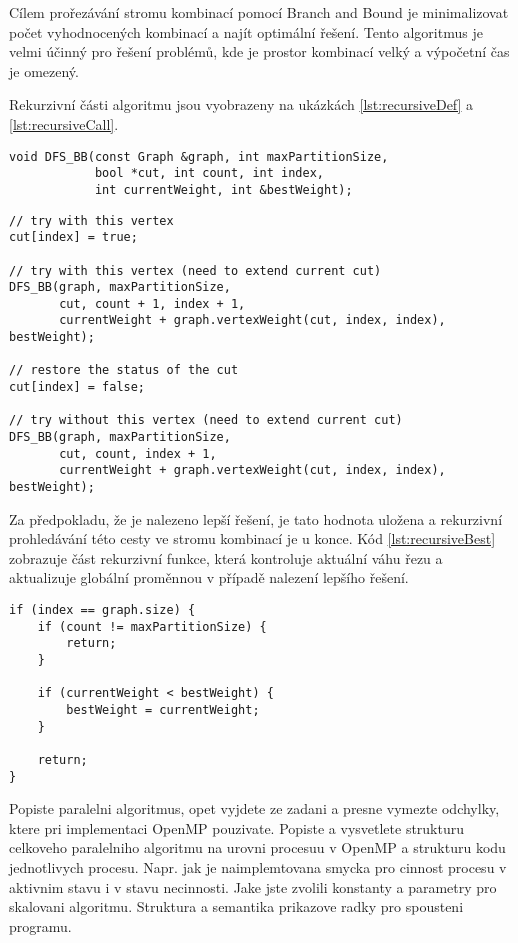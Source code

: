 \documentclass[epsf,epic,eepic,eepicemu]{article}\oddsidemargin=-5mm
\begin{document}
Cílem prořezávání stromu kombinací pomocí Branch and Bound je minimalizovat počet vyhodnocených kombinací a najít optimální řešení. Tento algoritmus je velmi účinný pro řešení problémů, kde je prostor kombinací velký a výpočetní čas je omezený. \cite{coursesPDPBFS}

Rekurzivní části algoritmu jsou vyobrazeny na ukázkách \ref{lst:recursiveDef} a \ref{lst:recursiveCall}.

\begin{lstlisting}[float,label=lst:recursiveDef, caption={Prototyp rekurzivní funkce}]
void DFS_BB(const Graph &graph, int maxPartitionSize,
            bool *cut, int count, int index,
            int currentWeight, int &bestWeight);
\end{lstlisting}

\begin{lstlisting}[float,label=lst:recursiveCall, caption={Rekurzivní volání}]
// try with this vertex
cut[index] = true;

// try with this vertex (need to extend current cut)
DFS_BB(graph, maxPartitionSize,
       cut, count + 1, index + 1,
       currentWeight + graph.vertexWeight(cut, index, index), bestWeight);

// restore the status of the cut
cut[index] = false;

// try without this vertex (need to extend current cut)
DFS_BB(graph, maxPartitionSize,
       cut, count, index + 1,
       currentWeight + graph.vertexWeight(cut, index, index), bestWeight);
\end{lstlisting}

Za předpokladu, že je nalezeno lepší řešení, je tato hodnota uložena a rekurzivní prohledávání této cesty ve stromu kombinací je u konce. Kód \ref{lst:recursiveBest} zobrazuje část rekurzivní funkce, která kontroluje aktuální váhu řezu a aktualizuje globální proměnnou v případě nalezení lepšího řešení.

\begin{lstlisting}[float,label=lst:recursiveBest, caption={Prototyp rekurzivní funkce}]
if (index == graph.size) {
    if (count != maxPartitionSize) {
        return;
    }

    if (currentWeight < bestWeight) {
        bestWeight = currentWeight;
    }
    
    return;
}
\end{lstlisting}



Popiste paralelni algoritmus, opet vyjdete ze zadani a presne vymezte
odchylky, ktere pri implementaci OpenMP pouzivate.
Popiste a vysvetlete strukturu celkoveho
paralelniho algoritmu na urovni procesuu v OpenMP a strukturu kodu
jednotlivych procesu. Napr. jak je naimplemtovana smycka pro cinnost
procesu v aktivnim stavu i v stavu necinnosti. Jake jste zvolili
konstanty a parametry pro skalovani algoritmu. Struktura a semantika
prikazove radky pro spousteni programu.
\end{document}
